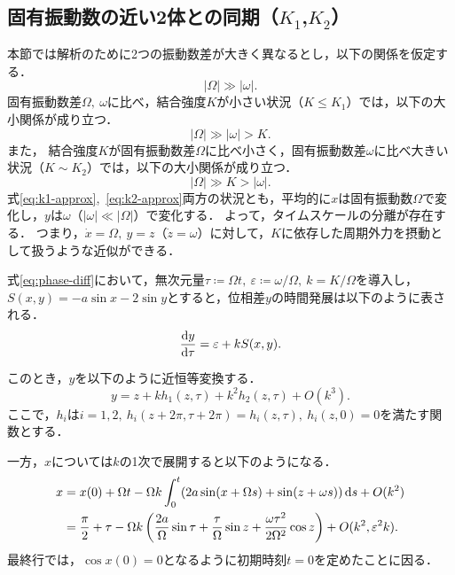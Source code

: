 \documentclass[../main]{subfiles}
\begin{document}
    \subsection{固有振動数の近い2体との同期（$K_1$,$K_2$）}
    \label{sec:3body-k12}
    本節では解析のために2つの振動数差が大きく異なるとし，以下の関係を仮定する．
    \begin{equation}
        \label{eq:assume}
        |\Omega|\gg|\omega|.
    \end{equation}
    固有振動数差$\Omega,\ \omega$に比べ，結合強度$K$が小さい状況（$K\leq K_1$）では，以下の大小関係が成り立つ．
    \begin{equation}
        \label{eq:k1-approx}
        |\Omega|\gg|\omega|>K.
    \end{equation}
    また，
    結合強度$K$が固有振動数差$\Omega$に比べ小さく，固有振動数差$\omega$に比べ大きい状況（$K\sim K_2$）では，以下の大小関係が成り立つ．
    \begin{equation}
        \label{eq:k2-approx}
        |\Omega|\gg K>|\omega|.
    \end{equation}
    式\eqref{eq:k1-approx},\ \eqref{eq:k2-approx}両方の状況とも，平均的に$x$は固有振動数$\Omega$で変化し，$y$は$\omega$（$|\omega|\ll|\Omega|$）で変化する．
    よって，タイムスケールの分離が存在する．
    つまり，$\dot{x}=\Omega,\ y=z$（$\dot{z}=\omega$）に対して，$K$に依存した周期外力を摂動として扱うような近似ができる．

    式\eqref{eq:phase-diff}において，無次元量$\tau\coloneqq\Omega t,\ \varepsilon\coloneqq\omega/\Omega,\ k=K/\Omega$を導入し，$S(x,y)=-a\sin x-2\sin y$とすると，位相差$y$の時間発展は以下のように表される．
    \begin{equation}
        \dv{y}{\tau}=\varepsilon+k S(x,y).
    \end{equation}

    このとき，$y$を以下のように近恒等変換する．
    \begin{equation}
        y=z+kh_1(z,\tau)+k^2h_2(z,\tau)+O(k^3).
        \label{eq:pertu-ytilde}
    \end{equation}
    ここで，$h_i$は$i=1,2,\ h_i(z+2\pi,\tau+2\pi)=h_i(z,\tau),\ h_i(z,0)=0$を満たす関数とする．

    一方，$x$については$k$の1次で展開すると以下のようになる．
    \begin{align}
        x&=x(0)+\Omega t-\Omega k\int_0^t(2a\sin(x+\Omega s)+\sin (z+\omega s))\dd{s}+O(k^2)\notag\\ 
        &=\frac{\pi}{2}+\tau-\Omega k\left(\frac{2a}{\Omega}\sin\tau+\frac{\tau}{\Omega}\sin z+\frac{\omega \tau^2}{2\Omega^2}\cos z\right)+O(k^2,\varepsilon^2k).\label{eq:x-series}
    \end{align}
    最終行では，$\cos x(0)=0$となるように初期時刻$t=0$を定めたことに因る．
    
\end{document}
